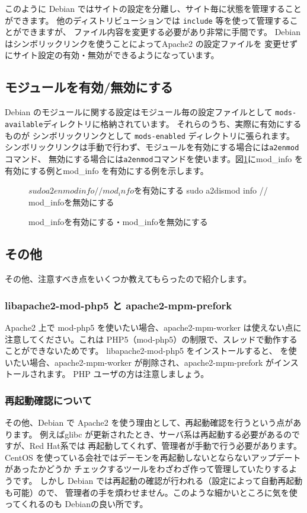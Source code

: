 \documentclass[mingoth,a4paper]{jsarticle}
\begin{document}
このように Debian ではサイトの設定を分離し、サイト毎に状態を管理することができます。
他のディストリビューションでは \texttt{include} 等を使って管理することができますが、
ファイル内容を変更する必要があり非常に手間です。
Debian はシンボリックリンクを使うことによってApache2 の設定ファイルを
変更せずにサイト設定の有効・無効ができるようになっています。

\subsection{モジュールを有効/無効にする}
Debian のモジュールに関する設定はモジュール毎の設定ファイルとして
\texttt{mods-available}ディレクトリに格納されています。
それらのうち、実際に有効にするものが
シンボリックリンクとして \texttt{mods-enabled} ディレクトリに張られます。
シンボリックリンクは手動で行わず、モジュールを有効にする場合には\texttt{a2enmod}コマンド、
無効にする場合には\texttt{a2enmod}コマンドを使います。図\ref{fig:a2enmod}にmod\_info を有効にする例とmod\_info を有効にする例を示します。

\begin{figure}[ht]
\begin{commandline}
$ sudo a2enmod info // mod_infoを有効にする 
$ sudo a2dismod info // mod_infoを無効にする
\end{commandline}
\label{fig:a2enmod}\caption{mod\_infoを有効にする・mod\_infoを無効にする}
\end{figure}

\subsection{その他}

その他、注意すべき点をいくつか教えてもらったので紹介します。

\subsubsection{libapache2-mod-php5 と apache2-mpm-prefork}

Apache2 上で mod-php5 を使いたい場合、apache2-mpm-worker は使えない点に
注意してください。これは PHP5（mod-php5）の制限で、スレッドで動作することができないためです。
libapache2-mod-php5 をインストールすると、
を使いたい場合、apache2-mpm-worker が削除され、apache2-mpm-prefork がインストールされます。
PHP ユーザの方は注意しましょう。

\subsubsection{再起動確認について}
その他、Debian で Apache2 を使う理由として、再起動確認を行うという点があります。
例えばglibc が更新されたとき、サーバ系は再起動する必要があるのですが、Red Hat系では
再起動してくれず、管理者が手動で行う必要があります。
CentOS を使っている会社ではデーモンを再起動しないとならないアップデートがあったかどうか
チェックするツールをわざわざ作って管理していたりするようです。
しかし Debian では再起動の確認が行われる（設定によって自動再起動も可能）ので、
管理者の手を煩わせません。このような細かいところに気を使ってくれるのも Debianの良い所です。
\end{document}
